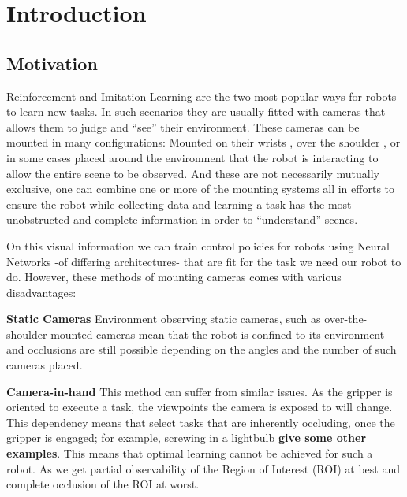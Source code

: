 \chapter{Introduction}
\section{Motivation}
    

  Reinforcement and Imitation Learning are the two most popular ways for robots to learn new tasks. In such scenarios they are usually fitted with cameras that allows them to judge and ``see'' their environment. These cameras can be mounted in many configurations: Mounted on their wrists \cite{chi2024UMIinthewild,openXEmbodimentRoboticLearning2024}, over the shoulder \cite{}, or in some cases placed around the environment \cite{} that the robot is interacting to allow the entire scene to be observed. And these are not necessarily mutually exclusive, one can combine one or more of the mounting systems \cite{exploringActiveVision2024chuang} all in efforts to ensure the robot while collecting data and learning a task has the most unobstructed and complete information in order to ``understand'' scenes.


  On this visual information we can train control policies for robots using Neural Networks \cite{spyros1995nnStateOfTheArt, Schmidhuber2015nn} -of differing architectures- that are fit for the task we need our robot to do. However, these methods of mounting cameras comes with various disadvantages:
  
  \textbf{Static Cameras} Environment observing static cameras, such as over-the-shoulder mounted cameras \cite{??} mean that the robot is confined to its environment and occlusions are still possible depending on the angles and the number of such cameras placed.
    
  \textbf{Camera-in-hand} This method can suffer from similar issues. As the gripper is oriented to execute a task, the viewpoints the camera is exposed to will change. This dependency means that select tasks that are inherently occluding, once the gripper is engaged; for example, screwing in a lightbulb \textbf{give some other examples}. This means that optimal learning cannot be achieved for such a robot. As we get partial observability of the Region of Interest (ROI) at best and complete occlusion of the ROI at worst.
    
